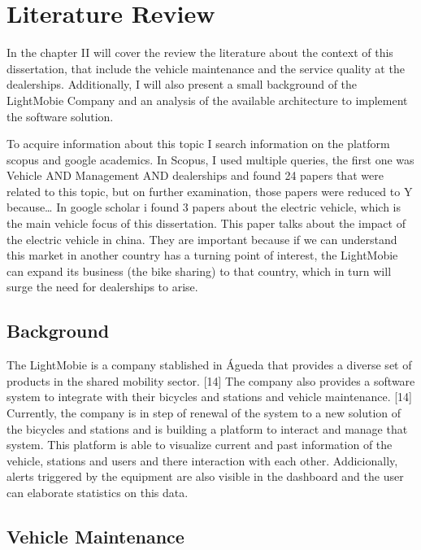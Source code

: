 \chapter{Literature Review}%
\label{chapter:literatureReview}

\begin{introduction}
In the chapter II will cover the review the literature about the context of this dissertation, that include the vehicle maintenance and the service quality at the dealerships. 
Additionally, I will also present a small background of the LightMobie Company and an analysis of the available architecture to implement the software solution.
\end{introduction} 


To acquire information about this topic I search information on the platform scopus and google academics. 
In Scopus, I used multiple queries, the first one was Vehicle AND Management AND dealerships and found 24 papers that were related to this topic, but on further examination, those papers were reduced to Y because… 
In google scholar i found 3 papers about the electric vehicle, which is the main vehicle focus of this dissertation. 
This paper talks about the impact of the electric vehicle in china. 
They are important because if we can understand this market in another country has a turning point of interest, the LightMobie can expand its business (the bike sharing) to that country, which in turn will surge the need for dealerships to arise.  


\section{Background}

The LightMobie is a company stablished in Águeda that provides a diverse set of products in the shared mobility sector. [14]
The company also provides a software system to integrate with their bicycles and stations and vehicle maintenance. [14]
Currently, the company is in step of renewal of the system to a new solution of the bicycles and stations and is building a platform to interact and manage that system.
This platform is able to visualize current and past information of the vehicle, stations and users and there interaction with each other.
Addicionally, alerts triggered by the equipment are also visible in the dashboard and the user can elaborate statistics on this data.

\section{Vehicle Maintenance}

